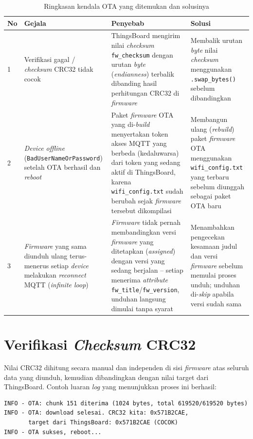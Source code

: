 \documentclass[12pt,a4paper]{report}
\begin{document}
\begin{table}[H]
\centering
\caption{Ringkasan kendala OTA yang ditemukan dan solusinya}
\label{tab:kendala}
\begin{tabular}{|p{0.5cm}|p{3.2cm}|p{4.3cm}|p{4.3cm}|}
\hline
\textbf{No} & \textbf{Gejala} & \textbf{Penyebab} & \textbf{Solusi} \\
\hline
1 &
Verifikasi gagal / \textit{checksum} CRC32 tidak cocok &
ThingsBoard mengirim nilai \textit{checksum} \texttt{fw\_checksum} dengan urutan
\textit{byte} (\textit{endianness}) terbalik dibanding hasil perhitungan CRC32 di \textit{firmware} &
Membalik urutan \textit{byte} nilai \textit{checksum} menggunakan \texttt{.swap\_bytes()}
sebelum dibandingkan \\
\hline
2 &
\textit{Device offline} (\texttt{BadUserNameOrPassword}) setelah OTA berhasil
dan \textit{reboot} &
Paket \textit{firmware} OTA yang di-\textit{build} menyertakan token akses MQTT yang
berbeda (kedaluwarsa) dari token yang sedang aktif di ThingsBoard, karena
\texttt{wifi\_config.txt} sudah berubah sejak \textit{firmware} tersebut dikompilasi &
Membangun ulang (\textit{rebuild}) paket \textit{firmware} OTA menggunakan
\texttt{wifi\_config.txt} yang terbaru sebelum diunggah sebagai paket OTA baru \\
\hline
3 &
\textit{Firmware} yang sama diunduh ulang terus-menerus setiap \textit{device} melakukan
\textit{reconnect} MQTT (\textit{infinite loop}) &
\textit{Firmware} tidak pernah membandingkan versi \textit{firmware} yang ditetapkan
(\textit{assigned}) dengan versi yang sedang berjalan -- setiap menerima \textit{attribute}
\texttt{fw\_title}/\texttt{fw\_version}, unduhan langsung dimulai tanpa syarat &
Menambahkan pengecekan kesamaan judul dan versi \textit{firmware} sebelum memulai proses
unduh; unduhan di-\textit{skip} apabila versi sudah sama \\
\hline
\end{tabular}
\end{table}

\section{Verifikasi \textit{Checksum} CRC32}
Nilai CRC32 dihitung secara manual dan independen di sisi \textit{firmware} atas seluruh
data yang diunduh, kemudian dibandingkan dengan nilai target dari ThingsBoard.
Contoh luaran \textit{log} yang menunjukkan proses ini berhasil:

\begin{lstlisting}[caption={Cuplikan log verifikasi CRC32 yang berhasil}]
INFO - OTA: chunk 151 diterima (1024 bytes, total 619520/619520 bytes)
INFO - OTA: download selesai. CRC32 kita: 0x571B2CAE,
       target dari ThingsBoard: 0x571B2CAE (COCOK)
INFO - OTA sukses, reboot...
\end{lstlisting}
\end{document}
